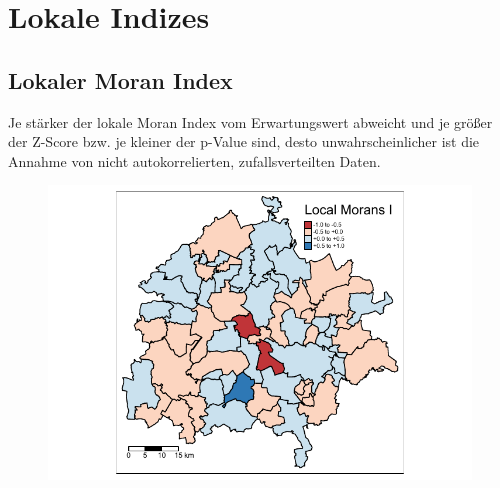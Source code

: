 \section{Lokale Indizes}
\label{ch:analysis-LISA}

\subsection{Lokaler Moran Index}
Je stärker der lokale Moran Index vom Erwartungswert abweicht und je größer der Z-Score bzw. je kleiner der p-Value sind, 
desto unwahrscheinlicher ist die Annahme von nicht autokorrelierten, zufallsverteilten Daten.

\begin{figure}[!ht]
    \setlength{\abovedisplayskip}{0pt}
    \setlength{\belowdisplayskip}{0pt}
    \setlength{\abovedisplayshortskip}{0pt}
    \setlength{\belowdisplayshortskip}{0pt}
\centering %
\begin{minipage}[b]{.48\linewidth} %
    \includegraphics[scale=0.75,trim={0.2cm 0.1cm 0.2cm 0.1cm},clip]{body/figures/analysis/metropol-LMI.pdf}%
\end{minipage} %
\hfill
\begin{minipage}[b]{.48\linewidth}

\end{minipage}
\end{figure}
